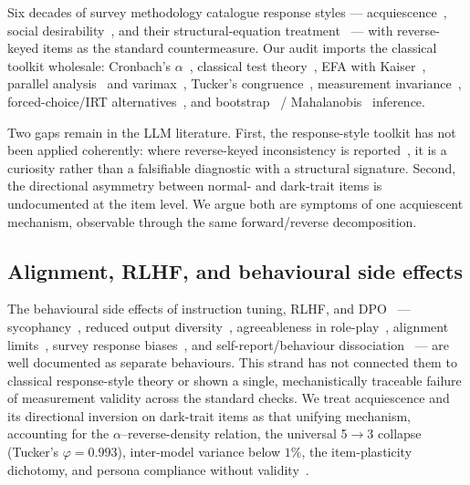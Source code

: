 \documentclass{article}
\begin{document}
Six decades of survey methodology catalogue response styles --- acquiescence~\citep{couch1960yeasayers}, social desirability~\citep{crowne1960social,paulhus1991response}, and their structural-equation treatment~\citep{billiet2000modeling,baumgartner2007modeling} --- with reverse-keyed items as the standard countermeasure. Our audit imports the classical toolkit wholesale: Cronbach's $\alpha$~\citep{cronbach1951coefficient}, classical test theory~\citep{lord1968statistical}, EFA with Kaiser~\citep{kaiser1960application}, parallel analysis~\citep{horn1965parallel} and varimax~\citep{kaiser1958varimax}, Tucker's congruence~\citep{tucker1951method}, measurement invariance~\citep{meredith1993measurement,vandenberg2000review}, forced-choice/IRT alternatives~\citep{brown2011forcedchoice,treaux2025forced}, and bootstrap~\citep{efron1979bootstrap} / Mahalanobis~\citep{mahalanobis1936generalised} inference.

Two gaps remain in the LLM literature. First, the response-style toolkit has not been applied coherently: where reverse-keyed inconsistency is reported~\citep{acquiescence2025emnlp}, it is a curiosity rather than a falsifiable diagnostic with a structural signature. Second, the directional asymmetry between normal- and dark-trait items is undocumented at the item level. We argue both are symptoms of one acquiescent mechanism, observable through the same forward/reverse decomposition.

\subsection{Alignment, RLHF, and behavioural side effects}
\label{sec:related-alignment}

The behavioural side effects of instruction tuning, RLHF, and DPO~\citep{wei2022flan,ouyang2022training,christiano2017deep,bai2022constitutional,rafailov2023dpo} --- sycophancy~\citep{perez2023discovering,sharma2024sycophancy}, reduced output diversity~\citep{kirk2023understanding}, agreeableness in role-play~\citep{zheng2024agreeableness}, alignment limits~\citep{wang2024aligning}, survey response biases~\citep{tjuatja2023response,dominguez2024questioning}, and self-report/behaviour dissociation~\citep{han2025personality} --- are well documented as separate behaviours. This strand has not connected them to classical response-style theory or shown a single, mechanistically traceable failure of measurement validity across the standard checks. We treat acquiescence and its directional inversion on dark-trait items as that unifying mechanism, accounting for the $\alpha$--reverse-density relation, the universal 5$\to$3 collapse (Tucker's $\varphi{=}0.993$), inter-model variance below $1\%$, the item-plasticity dichotomy, and persona compliance without validity~\citep{salecha2024llm,laverghetta2022predicting}.
\end{document}

